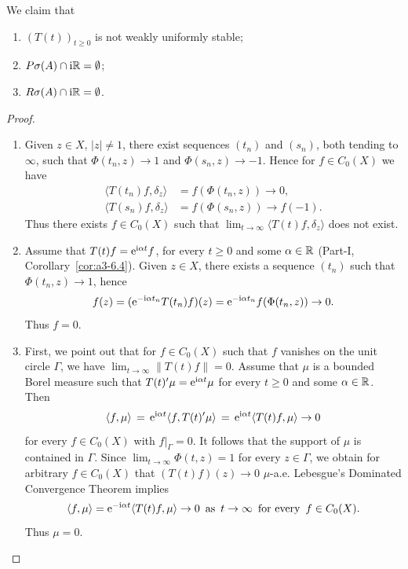 \begin{example}
\begin{enumerate}[\upshape (i), wide, labelindent=.25em]
 
We claim that
\begin{enumerate}[\upshape  (1)]
	\item 
	$(T(t))_{t \geq 0}$ is not weakly uniformly stable;
	
	\item 
	$P\sigma(A)\cap\mathrm{i}\mathbb{R} = \emptyset$;
	
	\item 
	$R\sigma(A)\cap\mathrm{i}\mathbb{R} = \emptyset$.
\end{enumerate}
\begin{proof}
\begin{enumerate}[\upshape (1), wide, labelindent=.25em]

\item
Given $z \in X$, $|z| \neq 1$, there exist sequences $(t_n)$ and $(s_n)$, both tending to $\infty$, such that $\Phi(t_n,z) \to 1$ and $\Phi(s_n,z) \to -1$. 
Hence for $f \in C_{0}(X)$ we have
\[
   \begin{aligned}
   \langle T(t_n)f,\delta_z \rangle &= f(\Phi(t_n,z)) \to 0 ,\\
   \langle T(s_n)f,\delta_z \rangle &= f(\Phi(s_n,z)) \to f(-1) .
   \end{aligned}
\]
Thus there exists $f \in C_{0}(X)$ such that $\lim_{t\to\infty} \langle T(t)f,\delta_z \rangle$ does not exist.


\item
Assume that $T(t)f = \mathrm{e}^{\mathrm{i}\alpha t}f$, for every $t \geq 0$ and some $\alpha \in \mathbb{R}$ (\cf Part-I, Corollary~\ref{cor:a3-6.4}). 
Given $z \in X$, there exists a sequence $(t_n)$ such that $\Phi(t_n,z) \to 1$, hence
\[f(z) = (\mathrm{e}^{-\mathrm{i}\alpha t_n}T(t_n)f)(z) = \mathrm{e}^{-\mathrm{i}\alpha t_n}f(\Phi(t_n,z)) \to 0. 
\]
Thus $f = 0$.




\item
First, we point out that for $f \in C_{0}(X)$ such that $f$ vanishes on the unit circle $\Gamma$, we have $\lim_{t\to\infty} \|T(t)f\| = 0$.
Assume that $\mu$ is a bounded Borel measure such that $T(t)'\mu = \mathrm{e}^{\mathrm{i}\alpha t}\mu$ for every $t \geq 0$ and some $\alpha \in \mathbb{R}$. 
Then 
\[\langle f,\mu \rangle \,=\, \mathrm{e}^{\mathrm{i}\alpha t}\langle f,T(t)'\mu \rangle \,=\, \mathrm{e}^{\mathrm{i}\alpha t}\langle T(t)f,\mu \rangle \to 0
\]
for every $f \in C_{0}(X)$ with $f|_\Gamma = 0$. 
It follows that the support of\/ $\mu$ is contained in $\Gamma$. Since $\lim_{t\to\infty} \Phi(t,z) = 1$ for every $z \in \Gamma$, we obtain for arbitrary $f \in C_{0}(X)$ that $(T(t)f)(z) \to 0$ $\mu$-a.e. 
Lebesgue's Dominated Convergence Theorem implies 
\[
\langle f,\mu \rangle = \mathrm{e}^{-\mathrm{i}\alpha t}\langle T(t)f,\mu \rangle \to 0
\text{ \,as\, } 
t \to \infty
\text{ \,for every\, } 
f \in C_{0}(X).
\]
Thus $\mu = 0$.
\qedhere
\end{enumerate}
\end{proof}
\end{enumerate}
\end{example}
